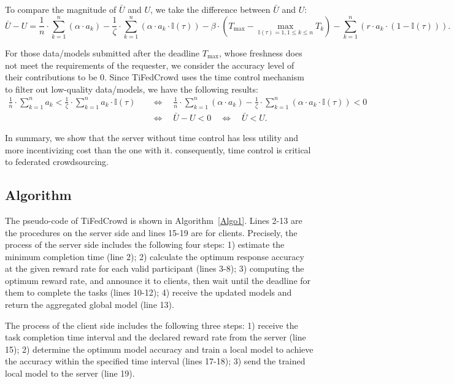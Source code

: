 \documentclass[final,1p,times]{elsarticle}
\begin{document}
To compare the magnitude of $\bar{U}$ and $U$, we take the difference between $\bar{U}$ and $U$:
\begin{equation}
	\bar{U} -U = \frac{1}{n}\cdot \sum_{k=1}^n(\alpha\cdot a_k)-\frac{1}{\zeta}\cdot \sum_{k=1}^n(\alpha\cdot a_k\cdot \mathbb{I}(\tau))- \beta\cdot(T_{\max}-\max_{\mathbb{I}(\tau)=1,1\le k\le n}T_k) - \sum_{k=1}^n(r\cdot a_k\cdot (1-\mathbb{I}(\tau))).
\end{equation}

For those data/models submitted after the deadline $T_{\max}$, whose freshness does not meet the requirements of the requester, we consider the accuracy level of their contributions to be $0$. Since TiFedCrowd uses the time control mechanism to filter out low-quality data/models, we have the following results:
\begin{equation}
	\begin{aligned}
		\frac{1}{n}\cdot \sum_{k=1}^n a_k < \frac{1}{\zeta}\cdot \sum_{k=1}^n a_k\cdot \mathbb{I}(\tau)\quad
		&\Leftrightarrow\quad \frac{1}{n}\cdot \sum_{k=1}^n(\alpha\cdot a_k)-\frac{1}{\zeta}\cdot \sum_{k=1}^n(\alpha\cdot a_k\cdot \mathbb{I}(\tau))<0\\&\Leftrightarrow\quad  \bar{U} -U<0\quad\Leftrightarrow\quad  \bar{U} < U.
	\end{aligned}
\end{equation}	

In summary, we show that the server without time control has less utility and more incentivizing cost than the one with it. consequently, time control is critical to federated crowdsourcing.

\subsection{Algorithm}
The pseudo-code of TiFedCrowd is shown in Algorithm~\ref{Algo1}. Lines 2-13 are the procedures on the server side and lines 15-19 are for clients. Precisely, the process of the server side includes the following four steps: 1) estimate the minimum completion time (line 2); 2) calculate the optimum response accuracy at the given reward rate for each valid participant (lines 3-8); 3) computing the optimum reward rate, and announce it to clients, then wait until the deadline for them to complete the tasks (lines 10-12); 4) receive the updated models and return the aggregated global model (line 13).

The process of the client side includes the following three steps: 1) receive the task completion time interval and the declared reward rate from the server (line 15); 2) determine the optimum model accuracy and train a local model to achieve the accuracy within the specified time interval (lines 17-18); 3) send the trained local model to the server (line 19).
\end{document}
